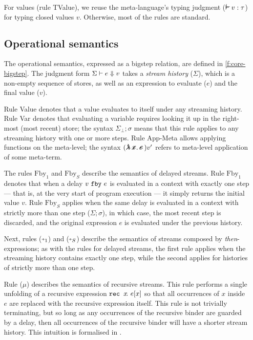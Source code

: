 \documentclass[sigplan,screen]{acmart}
\begin{document}
For values (rule TValue), we reuse the \fstar{} meta-language's typing judgment ($\mtyping{}{v}{\tau}$) for typing closed values $v$.
Otherwise, most of the rules are standard.

\subsection{Operational semantics}
\label{ss:operational-semantics}

The operational semantics, expressed as a bigstep relation, are defined in \autoref{f:core-bigstep}.
The judgment form $\Sigma \vdash e \Downarrow v$ takes a \emph{stream history} ($\Sigma$), which is a non-empty sequence of stores, as well as an expression to evaluate ($e$) and the final value ($v$).

Rule Value denotes that a value evaluates to itself under any streaming history.
Rule Var denotes that evaluating a variable requires looking it up in the right-most (most recent) store; the syntax $\Sigma_\bot; \sigma$ means that this rule applies to any streaming history with one or more steps.
Rule App-Meta allows applying functions on the meta-level; the syntax $(\mlamX{}) v'$ refers to meta-level application of some meta-term.

The rules $\mbox{Fby}_1$ and $\mbox{Fby}_S$ describe the semantics of delayed streams.
Rule $\mbox{Fby}_1$ denotes that when a delay $v~\texttt{fby}~e$ is evaluated in a context with exactly one step --- that is, at the very start of program execution --- it simply returns the initial value $v$.
Rule $\mbox{Fby}_S$ applies when the same delay is evaluated in a context with strictly more than one step ($\Sigma; \sigma$), in which case, the most recent step is discarded, and the original expression $e$ is evaluated under the previous history.

Next, rules ($\xthenarrow_1$) and ($\xthenarrow_S$) describe the semantics of streams composed by \emph{then}-expressions; as with the rules for delayed streams, the first rule applies when the streaming history contains exactly one step, while the second applies for histories of strictly more than one step.

Rule ($\mu{}$) describes the semantics of recursive streams.
This rule performs a single unfolding of a recursive expression $\texttt{rec~} x \!.~e[x]$ so that all occurrences of $x$ inside $e$ are replaced with the recursive expression itself.
This rule is not trivially terminating, but so long as any occurrences of the recursive binder are guarded by a delay, then all occurrences of the recursive binder will have a shorter stream history.
This intuition is formalised in \REF{}.
\end{document}
